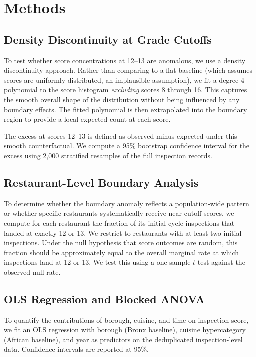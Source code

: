 \documentclass[11pt, twocolumn]{article}
\begin{document}
\section{Methods}

\subsection{Density Discontinuity at Grade Cutoffs}

To test whether score concentrations at 12--13 are anomalous, we use a
density discontinuity approach. Rather than comparing to a flat baseline
(which assumes scores are uniformly distributed, an implausible
assumption), we fit a degree-4 polynomial to the score histogram
\textit{excluding} scores 8 through 16. This captures the smooth overall
shape of the distribution without being influenced by any boundary
effects. The fitted polynomial is then extrapolated into the boundary
region to provide a local expected count at each score.

The excess at scores 12--13 is defined as observed minus expected under
this smooth counterfactual. We compute a 95\% bootstrap confidence
interval for the excess using 2,000 stratified resamples of the full
inspection records.

\subsection{Restaurant-Level Boundary Analysis}

To determine whether the boundary anomaly reflects a population-wide
pattern or whether specific restaurants systematically receive near-cutoff
scores, we compute for each restaurant the fraction of its initial-cycle
inspections that landed at exactly 12 or 13. We restrict to restaurants
with at least two initial inspections. Under the null hypothesis that
score outcomes are random, this fraction should be approximately equal
to the overall marginal rate at which inspections land at 12 or 13.
We test this using a one-sample $t$-test against the observed null rate.

\subsection{OLS Regression and Blocked ANOVA}

To quantify the contributions of borough, cuisine, and time on inspection
score, we fit an OLS regression with borough (Bronx baseline), cuisine
hypercategory (African baseline), and year as predictors on the
deduplicated inspection-level data. Confidence intervals are reported at
95\%.
\end{document}
